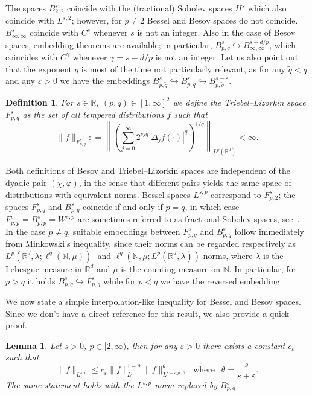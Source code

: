 \documentclass[10pt]{article}
\newcommand{\tmop}[1]{\ensuremath{\operatorname{#1}}}
\newtheorem{definition}{Definition}
\newtheorem{lemma}{Lemma}
\begin{document}
The spaces $B^s_{2, 2}$ coincide with the (fractional) Sobolev spaces $H^s$
which also coincide with $L^{s, 2}$; however, for $p \neq 2$ Bessel and Besov
spaces do not coincide. $B^s_{\infty, \infty}$ coincide with $C^s$ whenever
$s$ is not an integer. Also in the case of Besov spaces, embedding theorems
are available; in particular, $B^s_{p, q} \hookrightarrow B^{s - d /
p}_{\infty, \infty}$, which coincides with $C^{\gamma}$ whenever $\gamma =
s - d / p$ is not an integer. Let us also point out that the exponent $q$ is
most of the time not particularly relevant, as for any $\tilde{q} < q$ and any
$\varepsilon > 0$ we have the embeddings $B^s_{p, \tilde{q}} \hookrightarrow
B^s_{p, q} \hookrightarrow B^{s - \varepsilon}_{p, \tilde{q}}$.

\begin{definition}
  \label{appendixA2 defn triebel}For $s \in \mathbb{R}$, $(p, q) \in [1,
  \infty]^2$ we define the Triebel--Lizorkin space $F^s_{p, q}$ as the set of
  all tempered distributions $f$ such that
  \[ \| f \|_{F^s_{p, q}} : = \left\| \left( \sum_{j = 0}^{\infty} 2^{s j q} |
     \Delta_j f (\cdot) |^q \right)^{1 / q} \right\|_{L^p (\mathbb{R}^d)} <
     \infty . \]
\end{definition}

Both definitions of Besov and Triebel--Lizorkin spaces are independent of the
dyadic pair $(\chi, \varphi)$, in the sense that different pairs yields the
same space of distributions with equivalent norms. Bessel spaces $L^{s, p}$
correspond to $F^s_{p, 2}$; the spaces $F^s_{p, q}$ and $B^s_{p, q}$ coincide
if and only if $p = q$, in which case $F^s_{p, p} = B^s_{p, p} = W^{s, p}$ are
sometimes referred to as fractional Sobolev spaces, see~{\cite{dinezza}}. In
the case $p \neq q$, suitable embeddings between $F^s_{p, q}$ and $B^s_{p, q}$
follow immediately from Minkowski's inequality, since their norms can be
regarded respectively as $L^p (\mathbb{R}^d, \lambda ; \ell^q (\mathbb{N},
\mu))$\mbox{-} and $\ell^q (\mathbb{N}, \mu ; L^p (\mathbb{R}^d,
\lambda))$\mbox{-}norms, where $\lambda$ is the Lebesgue measure in
$\mathbb{R}^d$ and $\mu$ is the counting measure on $\mathbb{N}$. In
particular, for $p > q$ it holds $B^s_{p, q} \hookrightarrow F^s_{p, q}$ while
for $p < q$ we have the reversed embedding.

We now state a simple interpolation-like inequality for Bessel and Besov
spaces. Since we don't have a direct reference for this result, we also
provide a quick proof.

\begin{lemma}
  \label{appendixA2 interpolation inequality}Let $s > 0$, $p \in [2, \infty)$,
  then for any $\varepsilon > 0$ there exists a constant $c_{\varepsilon}$
  such that
  \[ \| f \|_{L^{s, p}} \leqslant c_{\varepsilon} \| f \|_{L^p}^{1 - \theta}
     \| f \|_{L^{s + \varepsilon, p}}^{\theta}, \enspace \tmop{where} \enspace
     \theta = \frac{s}{s + \varepsilon} . \]
  The same statement holds with the $L^{s, p}$ norm replaced by $B^s_{p, q}$.
\end{lemma}
\end{document}
